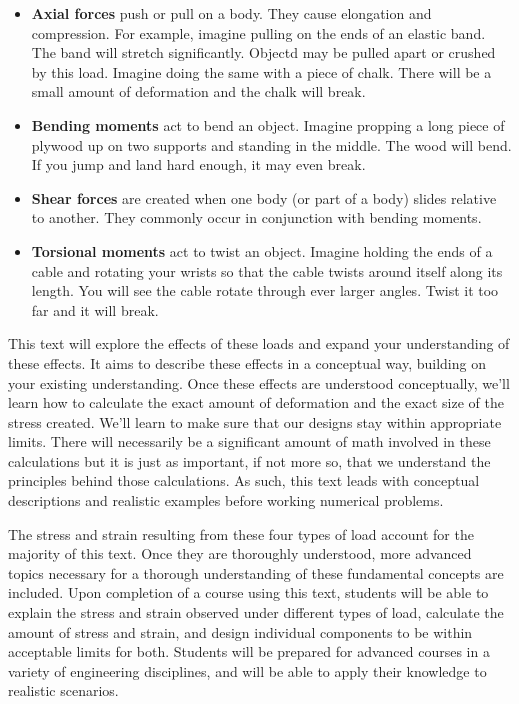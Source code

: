 \documentclass[
  letterpaper,
  DIV=11,
  numbers=noendperiod]{scrreprt}
\begin{document}
\begin{itemize}
\item
  \textbf{Axial forces} push or pull on a body. They cause elongation
  and compression. For example, imagine pulling on the ends of an
  elastic band. The band will stretch significantly. Objectd may be
  pulled apart or crushed by this load. Imagine doing the same with a
  piece of chalk. There will be a small amount of deformation and the
  chalk will break.
\item
  \textbf{Bending moments} act to bend an object. Imagine propping a
  long piece of plywood up on two supports and standing in the middle.
  The wood will bend. If you jump and land hard enough, it may even
  break.
\item
  \textbf{Shear forces} are created when one body (or part of a body)
  slides relative to another. They commonly occur in conjunction with
  bending moments.
\item
  \textbf{Torsional moments} act to twist an object. Imagine holding the
  ends of a cable and rotating your wrists so that the cable twists
  around itself along its length. You will see the cable rotate through
  ever larger angles. Twist it too far and it will break.
\end{itemize}

This text will explore the effects of these loads and expand your
understanding of these effects. It aims to describe these effects in a
conceptual way, building on your existing understanding. Once these
effects are understood conceptually, we'll learn how to calculate the
exact amount of deformation and the exact size of the stress created.
We'll learn to make sure that our designs stay within appropriate
limits. There will necessarily be a significant amount of math involved
in these calculations but it is just as important, if not more so, that
we understand the principles behind those calculations. As such, this
text leads with conceptual descriptions and realistic examples before
working numerical problems.

The stress and strain resulting from these four types of load account
for the majority of this text. Once they are thoroughly understood, more
advanced topics necessary for a thorough understanding of these
fundamental concepts are included. Upon completion of a course using
this text, students will be able to explain the stress and strain
observed under different types of load, calculate the amount of stress
and strain, and design individual components to be within acceptable
limits for both. Students will be prepared for advanced courses in a
variety of engineering disciplines, and will be able to apply their
knowledge to realistic scenarios.
\end{document}
